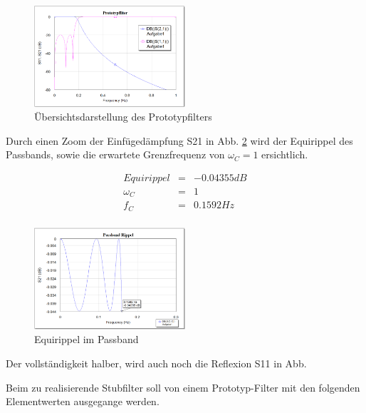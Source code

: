 \begin{figure}[h!]
\centering
 	\includegraphics[width=0.5\textwidth]{Ovw_Prototyp.png}
 	\caption{Übersichtsdarstellung des Prototypfilters}
 	\label{fig:Ovw_Prototyp}
\end{figure}

Durch einen Zoom der Einfügedämpfung S21 in Abb. \ref{fig:Prototyp_Passbandrippel} wird der Equirippel des Passbands, sowie die erwartete Grenzfrequenz von $\omega_C = 1$  ersichtlich.

\begin{mdframed}
\begin{equation*} 
\begin{array}{rclcl} 
Equirippel & = & -0.04355 dB \\ 
\omega_C & = & 1 \\ 
f_C & = & 0.1592 Hz \\ 
\end{array} 
\end{equation*} 
\end{mdframed}

\begin{figure}[h!]
\centering
 	\includegraphics[width=0.5\textwidth]{Prototyp_Passbandrippel.png}
 	\caption{Equirippel im Passband}
 	\label{fig:Prototyp_Passbandrippel}
\end{figure}

Der vollständigkeit halber, wird auch noch die Reflexion S11 in Abb. 


Beim zu realisierende Stubfilter soll von einem Prototyp-Filter mit den folgenden Elementwerten ausgegange werden.

